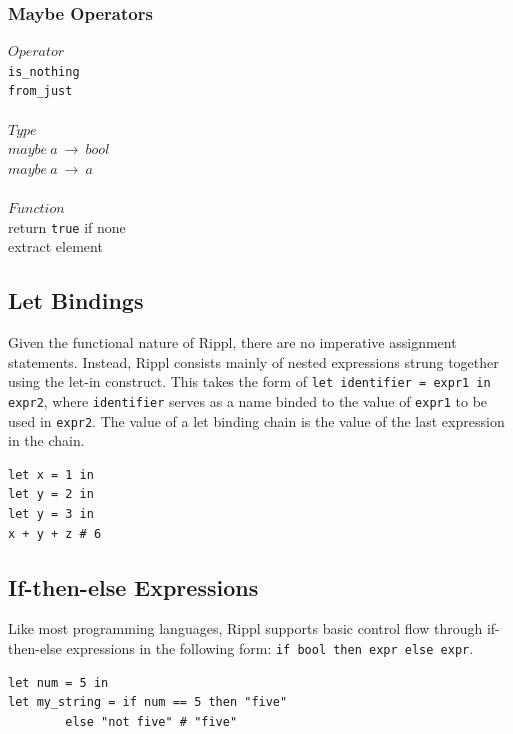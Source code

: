 \documentclass[5pt]{article}
\begin{document}
\subsubsection{Maybe Operators}
\begin{multicols}{3}
\noindent $Operator$ \\
\hspace*{5mm} \texttt{is\_nothing} \\
\hspace*{5mm} \texttt{from\_just} \\
\columnbreak \\
\noindent $Type$ \\
$maybe \ a \ \rightarrow \  bool$ \\
$maybe \ a \ \rightarrow \  a$ \\
\columnbreak \\
\noindent $Function$ \\
return \texttt{true} if none \\
extract element \\
\end{multicols}
\pagebreak


\subsection{Let Bindings}
Given the functional nature of Rippl, there are no imperative assignment statements. Instead, Rippl consists mainly of nested expressions strung together
using the let-in construct. This takes the form of \texttt{let identifier = expr1 in expr2}, where \texttt{identifier} serves as a name binded to the value of \texttt{expr1} to be used in \texttt{expr2}. The value of a let binding chain is the value of the last expression in the chain.
\begin{lstlisting}[language=rippl]
let x = 1 in 
let y = 2 in 
let y = 3 in
x + y + z # 6
\end{lstlisting}

\subsection{If-then-else Expressions}
Like most programming languages, Rippl supports basic control flow through if-then-else expressions in the following form:
\texttt{if bool then expr else expr}.

\begin{lstlisting}[language=rippl]
let num = 5 in
let my_string = if num == 5 then "five" 
        else "not five" # "five"
\end{lstlisting}
\end{document}
